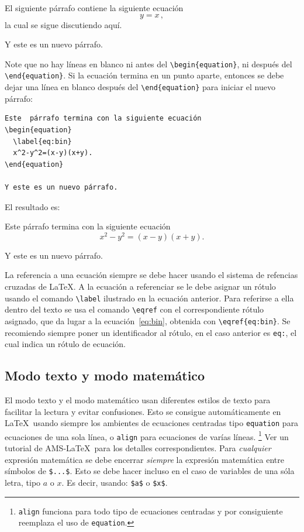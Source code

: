\documentclass{article}
\begin{document}
El siguiente párrafo contiene la siguiente ecuación
\begin{equation}
  \label{eq:1}
  y=x\,,
\end{equation}
la cual se sigue discutiendo aquí.

Y este es un nuevo párrafo.

\bigskip

Note que no hay líneas en blanco ni antes del \verb|\begin{equation}|, ni después del \verb|\end{equation}|. Si la ecuación termina en un punto aparte, entonces se debe dejar una línea en blanco después del \verb|\end{equation}| para iniciar el nuevo párrafo:

\begin{lstlisting}
Este  párrafo termina con la siguiente ecuación
\begin{equation}
  \label{eq:bin}
  x^2-y^2=(x-y)(x+y).
\end{equation}

Y este es un nuevo párrafo.
\end{lstlisting}
El resultado es:

Este  párrafo termina con la siguiente ecuación
\begin{equation}
  \label{eq:bin}
  x^2-y^2=(x-y)(x+y).
\end{equation}

Y este es un nuevo párrafo. 

La referencia a una ecuación siempre se debe hacer usando el sistema de refencias cruzadas de \LaTeX{}. A la ecuación a referenciar se le debe asignar un rótulo usando el comando \verb|\label| ilustrado en la ecuación anterior. Para referirse a ella dentro del texto se usa el comando \verb|\eqref| con el correspondiente rótulo asignado, que da lugar a la ecuación~\eqref{eq:bin}, obtenida con \verb|\eqref{eq:bin}|. Se recomiendo siempre poner un identificador al rótulo, en el caso anterior es \verb|eq:|, el cual indica un rótulo de ecuación.

\subsection{Modo texto y modo matemático}

El modo texto y el modo matemático usan diferentes estilos de texto para facilitar la lectura y evitar confusiones. Esto se consigue automáticamente en \LaTeX\ usando siempre los ambientes de ecuaciones centradas tipo \verb|equation| para ecuaciones de una sola línea, o \verb|align| para ecuaciones de varías líneas. 
\footnote{\texttt{align} funciona para todo tipo de ecuaciones centradas y por consiguiente reemplaza el uso de \texttt{equation}. }
Ver un tutorial de AMS-\LaTeX\ para los detalles correspondientes. Para \emph{cualquier} expresión matemática se debe encerrar  \emph{siempre} la expresión matemática entre símbolos de \verb|$...$|.
Esto se debe hacer incluso en el caso de variables de una sóla letra, tipo $a$ o $x$. Es decir, usando: \verb|$a$| o \verb|$x$|.
\end{document}
